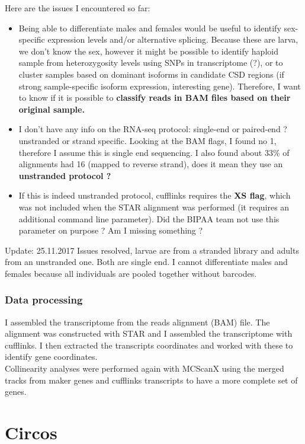 \documentclass[10pt,a4paper]{report}
\begin{document}
\begin{itemize}
Here are the issues I encountered so far:
\begin{itemize}
\item Being able to differentiate males and females would be useful to identify sex-specific expression levels and/or alternative splicing. Because these are larva, we don't know the sex, however it might be possible to identify haploid sample from heterozygosity levels using SNPs in transcriptome (?), or to cluster samples based on dominant isoforms in candidate CSD regions (if strong sample-specific isoform expression, interesting gene). Therefore, I want to know if it is possible to \textbf{classify reads in BAM files based on their original sample.}
\item I don't have any info on the RNA-seq protocol: single-end or paired-end ? unstranded or strand specific. Looking at the BAM flags, I found no 1, therefore I assume this is single end sequencing. I also found about 33\% of alignments had 16 (mapped to reverse strand), does it mean they use an \textbf{unstranded protocol ?}
\item If this is indeed unstranded protocol, cufflinks requires the \textbf{XS flag}, which was not included when the  STAR alignment was performed (it requires an additional  command line parameter). Did the BIPAA team not use this parameter on purpose ? Am I missing something ?

\end{itemize}
\end{itemize}
\FloatBarrier
Update: 25.11.2017
Issues resolved, larvae are from a stranded library and adults from an unstranded one. Both are single end. I cannot differentiate males and females because all individuals are pooled together without barcodes.

\subsection{Data processing}

I assembled the transcriptome from the reads alignment (BAM) file. The alignment was constructed with STAR and I assembled the transcriptome with cufflinks. I then extracted the transcripts coordinates and worked with these to identify gene coordinates.\\
Collinearity analyses were performed again with MCScanX using the merged tracks from maker genes and cufflinks transcripts to have a more complete set of genes.

\chapter{Circos}
\end{document}
